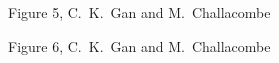 \commentoutA{\documentclass[prl,aps,twocolumn,showpacs,twocolumngrid,superbib]{revtex4}}
\begin{document}
{\pagebreak
\begin{center}
Figure 5, C.~K.~Gan and M.~Challacombe \\[1.cm]
\end{center}

\pagebreak
\begin{center}
Figure 6, C.~K.~Gan and M.~Challacombe \\[1.cm]
\end{center}

}
\end{document}
